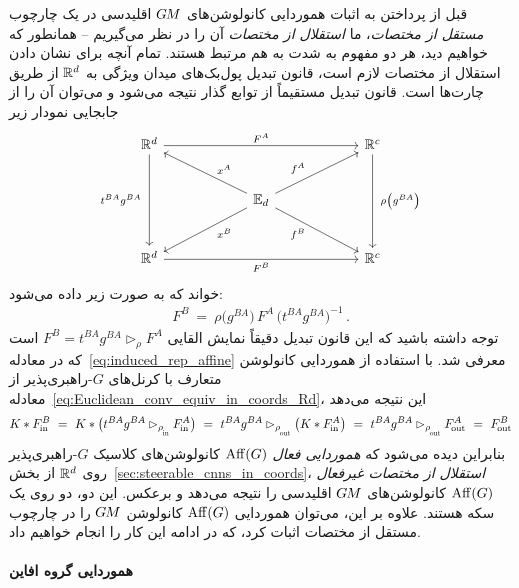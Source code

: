 قبل از پرداختن به اثبات هموردایی کانولوشن‌های $G\mkern-1.4muM$ اقلیدسی در یک چارچوب \emph{مستقل از مختصات}، ما \emph{استقلال از مختصات} آن را در نظر می‌گیریم -- همانطور که خواهیم دید، هر دو مفهوم به شدت به هم مرتبط هستند.
تمام آنچه برای نشان دادن استقلال از مختصات لازم است، قانون تبدیل پول‌بک‌های میدان ویژگی به $\mathbb{R}^d$ از طریق چارت‌ها است.
قانون تبدیل مستقیماً از توابع گذار نتیجه می‌شود و می‌توان آن را از جابجایی نمودار زیر
\begin{equation}\label{cd:feature_field_chart_pullback_Rd_transitions}
	\begin{tikzcd}[row sep=2.5em, column sep=6em]
		\R^d
		\arrow[rr, "{F^A}"]
		\arrow[dd, "{t^{BA} g^{BA}}\ "']
		& &
		\R^c
		\arrow[dd, "{\ \rho\big( g^{BA} \big)}"]
		\\
		&
		\Euc_d
		\arrow[ul, pos=.4, "{x^A}"']
		\arrow[dl, pos=.4, "{x^B}"]
		\arrow[ur, pos=.4, "{f^A}"]
		\arrow[dr, pos=.4, "{f^B}"']
		\\
		\R^d
		\arrow[rr, "{F^B}"']
		& &
		\R^c
	\end{tikzcd}
\end{equation}
خواند که به صورت زیر داده می‌شود:
\begin{align}
	F^B\ =\ \rho\big( g^{BA} \big) \,F^A\, \big( t^{BA} g^{BA} \big)^{-1} \,.
\end{align}
توجه داشته باشید که این قانون تبدیل دقیقاً نمایش القایی $F^B = t^{BA}g^{BA} \rhd_\rho F^A$ است که در معادله~\eqref{eq:induced_rep_affine} معرفی شد.
با استفاده از هموردایی کانولوشن متعارف با کرنل‌های $G$-راهبری‌پذیر از معادله~\eqref{eq:Euclidean_conv_equiv_in_coords_Rd}، این نتیجه می‌دهد
\begin{align}\label{eq:Euclidean_conv_coordinate_independence}
	K*\Fin^B
	\ =\ K* \big( t^{BA} g^{BA} \rhd_{\rhoin} \Fin^A \big)
	\ =\ t^{BA} g^{BA} \rhd_{\rhoout} \big( K * \Fin^A \big)
	\ =\ t^{BA} g^{BA} \rhd_{\rhoout} \Fout^A
	\ =\ \Fout^B
\end{align}
بنابراین دیده می‌شود که \emph{هموردایی فعال $\operatorname{Aff}(G)$} کانولوشن‌های کلاسیک $G$-راهبری‌پذیر روی $\mathbb{R}^d$ از بخش~\ref{sec:steerable_cnns_in_coords}، \emph{استقلال از مختصات غیرفعال $\operatorname{Aff}(G)$} کانولوشن‌های $G\mkern-1.4muM$ اقلیدسی را نتیجه می‌دهد و برعکس.
این دو، دو روی یک سکه هستند.
علاوه بر این، می‌توان هموردایی $\operatorname{Aff}(G)$ کانولوشن $G\mkern-1.4muM$ را در چارچوب مستقل از مختصات اثبات کرد، که در ادامه این کار را انجام خواهیم داد.

\paragraph{هموردایی گروه افاین}

